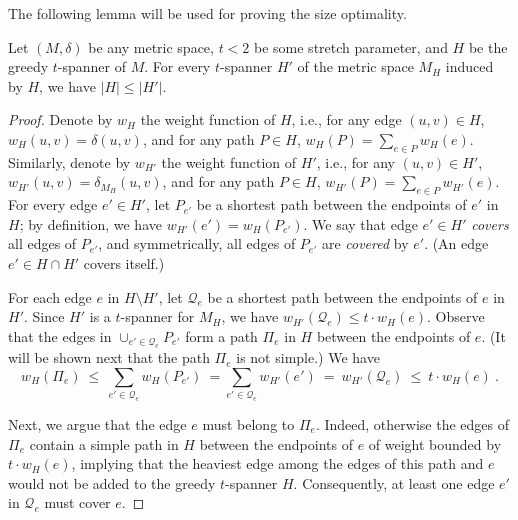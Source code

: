 \documentclass[11pt,letterpaper]{article}
\begin{document}
The following lemma will be used  for proving the size optimality.
\begin{lemma}\label{lem:metric_spars}
	Let $(M,\delta)$ be any metric space, $t < 2$ be some stretch parameter, and $H$ be the greedy $t$-spanner of $M$.
	For every $t$-spanner $H'$ of the metric space $M_H$ induced by $H$, we have $|H| \le |H'|$.
\end{lemma}
\begin{proof}
	Denote by $w_H$ the weight function of $H$, i.e., for any edge $(u,v)\in H$, $w_H(u,v)=\delta(u,v)$,
	and for any path $P \in H$, $w_H(P) = \sum_{e \in P} w_H(e)$.
	Similarly, denote by $w_{H'}$ the weight function of $H'$, i.e., for any $(u,v)\in H'$, $w_{H'}(u,v)=\delta_{M_H}(u,v)$,
	and for any path $P \in H$, $w_{H'}(P) = \sum_{e \in P} w_{H'}(e)$.
	For every edge $e'\in H'$, let $P_{e'}$ be a shortest path between the endpoints of $e'$ in $H$; by definition, we have $w_{H'}(e')=w_H(P_{e'})$.
	We say that edge $e'\in H'$ \emph{covers} all edges of $P_{e'}$, and symmetrically, all edges of $P_{e'}$ are \emph{covered} by $e'$.
	(An edge $e' \in H \cap H'$ covers itself.)
	
	For each edge $e$ in $H \setminus H'$, let $\mathcal{Q}_{e}$ be a shortest path
	between the endpoints of $e$ in $H'$. Since $H'$ is a $t$-spanner for $M_H$, we have $w_{H'}(\mathcal{Q}_{e}) \le t\cdot w_H(e)$.
	Observe that the edges in $\cup_{e'\in\mathcal{Q}_{e}} P_{e'}$ form a  path $\Pi_e$ in $H$ between the endpoints of $e$.
	(It will be shown next that the path $\Pi_e$ is not simple.)
	We have
	$$w_{H}(\Pi_e) ~\le~ \sum_{e'\in\mathcal{Q}_{e}}w_{H}(P_{e'}) ~= \sum_{e'\in\mathcal{Q}_{e}}w_{H'}(e') ~=~ w_{H'}(\mathcal{Q}_{e}) ~\le~ t\cdot w_{H}(e)~.$$
	
	
	Next, we argue that the edge $e$ must belong to $\Pi_e$.
	Indeed, otherwise the edges of
	$\Pi_e$ contain a simple path in $H$ between the endpoints of $e$ of weight bounded by $t \cdot w_H(e)$,
	implying that the heaviest edge among the edges of this path and $e$ would not be added to the greedy $t$-spanner $H$.
	Consequently, at least one edge $e'$ in $\mathcal{Q}_{e}$ must cover $e$.
	

\end{proof}
\end{document}
